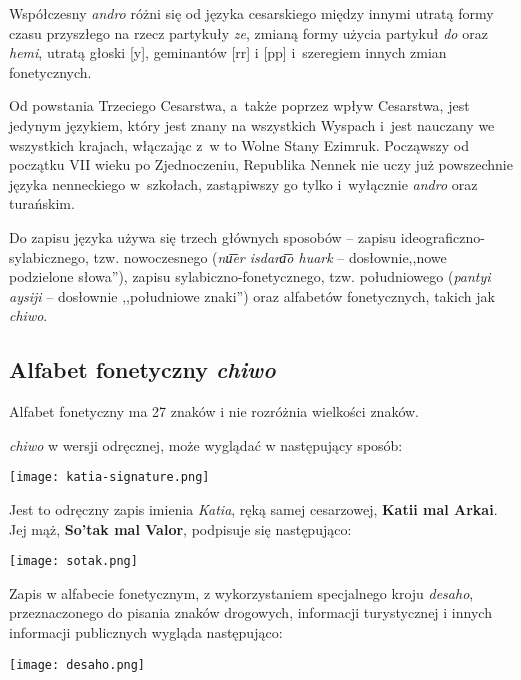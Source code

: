 \begin{spacing}{1.1}
Współczesny \emph{andro} różni się od języka cesarskiego między innymi utratą
formy czasu przyszłego na rzecz partykuły \emph{ze}, zmianą formy użycia
partykuł \emph{do} oraz \emph{hemi}, utratą głoski [y], geminantów [rr] i [pp]
i~szeregiem innych zmian fonetycznych.

Od powstania Trzeciego Cesarstwa, a~także poprzez wpływ Cesarstwa, jest jedynym
językiem, który jest znany na wszystkich Wyspach i~jest nauczany we wszystkich
krajach, włączając z~w to Wolne Stany Ezimruk. Począwszy od początku VII wieku
po Zjednoczeniu, Republika Nennek nie uczy już powszechnie języka nenneckiego
w~szkołach, zastąpiwszy go tylko i~wyłącznie \emph{andro} oraz turańskim.

Do zapisu języka używa się trzech głównych sposobów -- zapisu
ideograficzno-sylabicznego, tzw. nowoczesnego (\emph{nu͞er isdara͞o huark} --
dosłownie,,nowe podzielone słowa''), zapisu sylabiczno-fonetycznego, tzw.
południowego (\emph{pantyi aysiji} -- dosłownie ,,południowe znaki'') oraz
alfabetów fonetycznych, takich jak \emph{chiwo}.

\subsection{Alfabet fonetyczny \emph{chiwo}}

Alfabet fonetyczny ma 27 znaków i nie rozróżnia wielkości znaków.

\emph{chiwo} w wersji odręcznej, może wyglądać w następujący sposób:

\begin{center}
    \texttt{[image: katia-signature.png]}    
\end{center}

Jest to odręczny zapis imienia \emph{Katia}, ręką samej cesarzowej,
\textbf{Katii mal Arkai}. Jej mąż, \textbf{So'tak mal Valor}, podpisuje się 
następująco:

\begin{center}
    \texttt{[image: sotak.png]}
\end{center}

Zapis w alfabecie fonetycznym, z wykorzystaniem specjalnego kroju \emph{desaho},
przeznaczonego do pisania znaków drogowych, informacji turystycznej i innych
informacji publicznych wygląda następująco:

\begin{center}
    \texttt{[image: desaho.png]}
\end{center}


\end{spacing}
